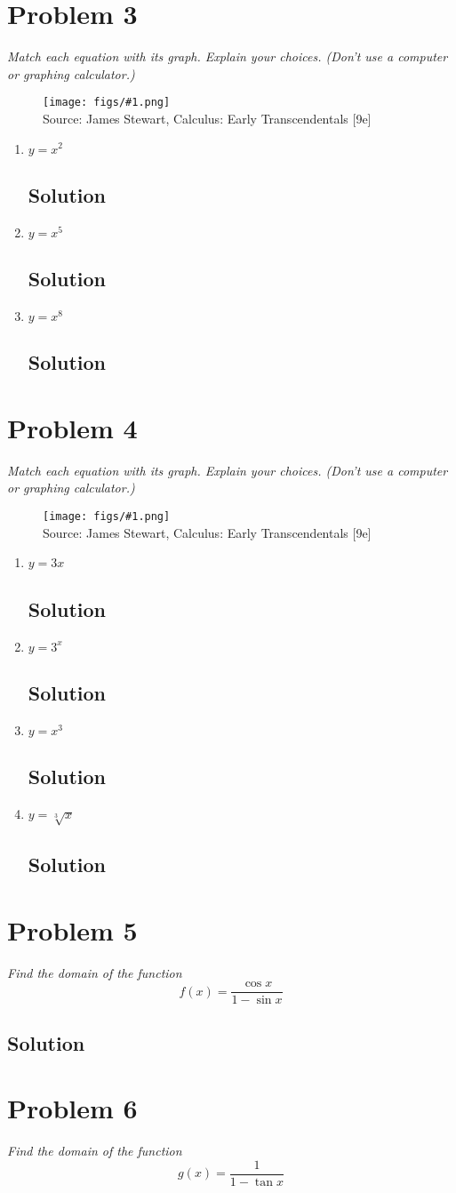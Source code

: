 \documentclass[11pt]{article}
\newcommand{\soln}{\subsection*}
\newcommand{\qn}{\textit}
\newcommand{\imagesource}[1]{{\footnotesize Source: #1}}
\newcommand{\imgqn}[1]{
	\begin{figure}[H]
		\centering
		\texttt{[image: figs/\#1.png]}\\
		\imagesource{James Stewart, Calculus: Early Transcendentals [9e]}
	\end{figure}
}
\begin{document}
\section*{Problem 3}

\qn{Match each equation with its graph. Explain your choices. (Don't use a computer or graphing calculator.)}

\imgqn{1.2.3}

\begin{enumerate}
	\item $y=x^2$
	\soln{Solution}
	
	\item $y=x^5$
	\soln{Solution}
	
	\item $y=x^8$
	\soln{Solution}
\end{enumerate}

\section*{Problem 4}

\qn{Match each equation with its graph. Explain your choices. (Don't use a computer or graphing calculator.)}

\imgqn{1.2.4}

\begin{enumerate}
	\item $y=3x$
	\soln{Solution}
	
	\item $y=3^x$
	\soln{Solution}
	
	\item $y=x^3$
	\soln{Solution}
	
	\item $y=\sqrt[3]{x}$
	\soln{Solution}
\end{enumerate}

\section*{Problem 5}

\qn{Find the domain of the function $$f(x)=\frac{\cos{x}}{1-\sin{x}}$$}

\soln{Solution}

\section*{Problem 6}

\qn{Find the domain of the function $$g(x)=\frac{1}{1-\tan{x}}$$}
\end{document}
